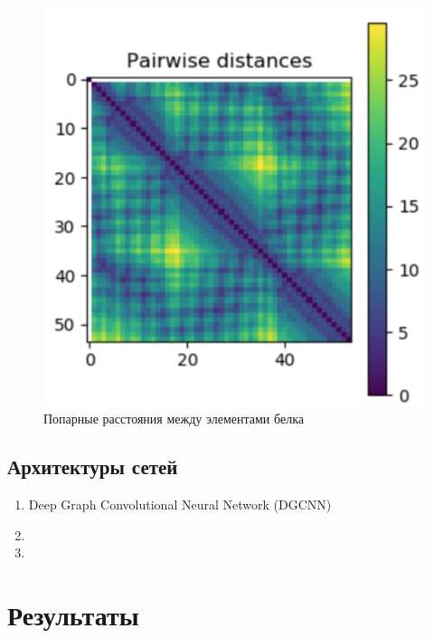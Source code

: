 \documentclass[12pt,twosides]{article}
\begin{document}
\begin{figure}[!h]
\begin{minipage}[b]{0.45\textwidth}
					\includegraphics[width=\textwidth]{fig2.pdf}
					\caption{Попарные расстояния между элементами белка}
				\end{minipage}
			\end{figure}

			
			\subsection{Архитектуры сетей}
				\begin{enumerate}
					\item Deep Graph Convolutional Neural Network (DGCNN)\cite{Zhang2018AnED}
					\item 
					\item 
				\end{enumerate}
	
	\section{Результаты}
	
	
	

	
	\nocite{*}
	
	
\end{document}
